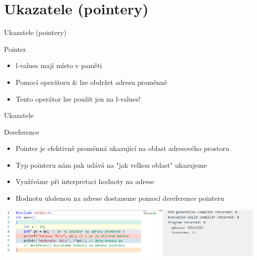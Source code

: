 \documentclass[9pt]{beamer}
\begin{document}
\section{Ukazatele (pointery)}

\begin{frame}{Ukazatele (pointery)}
    \begin{block}{Pointer}
        \begin{itemize}
            \item l-values mají místo v paměti
            \item Pomocí operátoru \& lze obdržet adresu proměnné
            \item Tento operátor lze použít jen na l-values!
        \end{itemize}
    \end{block}
    
\end{frame}

\begin{frame}{Ukazatele}
    \begin{block}{Dereference}
        \begin{itemize}
            \item Pointer je efektivně proměnná ukazující na oblast adresového prostoru
            \item Typ pointeru nám pak udává na "jak velkou oblast" ukazujeme
            \item Využíváme při interpretaci hodnoty na adrese
            \item Hodnotu uloženou na adrese dostaneme pomocí dereference pointeru
        \end{itemize}
    \end{block}
    \begin{center}
        \includegraphics[width=0.99\linewidth]{lekce20/dereference.png}
    \end{center}
\end{frame}
\end{document}
